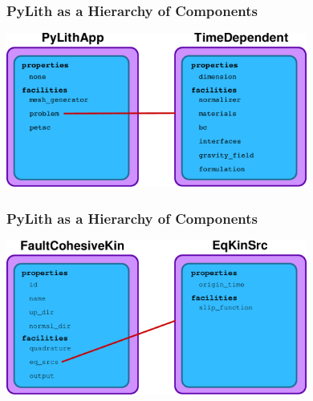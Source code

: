 \documentclass{beamer}
\begin{document}
\begin{frame}
  \frametitle{PyLith as a Hierarchy of Components}

  \vfill
  \begin{center}
    \includegraphics[height=2.0in]{figs/pylithapp}
  \end{center}  
  \vfill

\end{frame}


\begin{frame}
  \frametitle{PyLith as a Hierarchy of Components}

  \vfill
  \begin{center}
    \includegraphics[height=2.0in]{figs/faultcohesivekin}
  \end{center}  
  \vfill

\end{frame}
\end{document}
